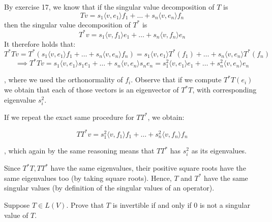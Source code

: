 \begin{solution}

    By exercise 17, we know that if the singular value decomposition of $T$ is
    $$Tv = s_1 \langle v, e_1 \rangle f_1 + \ldots + s_n \langle v, e_n \rangle f_n$$
    then the singular value decomposition of $T^*$ is
    $$T^*v = s_1 \langle v, f_1 \rangle e_1 + \ldots + s_n \langle v, f_n \rangle e_n$$
    It therefore holds that:
    $$T^*Tv = T^*(s_1 \langle v, e_1 \rangle f_1 + \ldots + s_n \langle v, e_n \rangle f_n) = s_1 \langle v, e_1 \rangle T^*(f_1) + \ldots + s_n \langle v, e_n \rangle T^*(f_n)$$
    $$\implies T^*Tv = s_1 \langle v, e_1 \rangle s_1 e_1 + \ldots + s_n \langle v, e_n \rangle s_n e_n = s_1^2 \langle v, e_1 \rangle e_1 + \ldots + s_n^2 \langle v, e_n \rangle e_n$$

    , where we used the orthonormality of $f_i$. Observe that if we compute $T^*T(e_i)$ we obtain that each of those vectors is an eigenvector of $T^*T$, with corresponding eigenvalue $s_i^2$.

    If we repeat the exact same procedure for $TT^*$, we obtain:

    $$TT^*v = s_1^2 \langle v, f_1 \rangle f_1 + \ldots + s_n^2 \langle v, f_n \rangle f_n$$

    , which again by the same reasoning means that $TT^*$ has $s_i^2$ as its eigenvalues.

    Since $T^*T, TT^*$ have the same eigenvalues, their positive square roots have the same eigenvalues too (by taking square roots). Hence, $T$ and $T^*$ have the same singular values (by definition of the singular values of an operator).
\end{solution}

\begin{exercise}{13}
    Suppose $T \in L(V)$. Prove that $T$ is invertible if and only if 0 is not a singular value of $T$.
\end{exercise}

